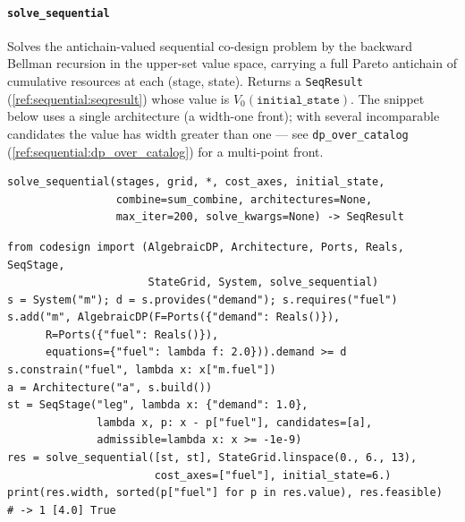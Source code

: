 \documentclass[11pt,a4paper]{article}
\begin{document}
\paragraph{\texttt{solve\_sequential}}\label{ref:sequential:solve_sequential}
Solves the antichain-valued sequential co-design problem by the backward
Bellman recursion in the upper-set value space, carrying a full Pareto
antichain of cumulative resources at each (stage, state). Returns a
\texttt{SeqResult} (\ref{ref:sequential:seqresult}) whose value is
$V_0(\texttt{initial\_state})$. The snippet below uses a single architecture
(a width-one front); with several incomparable candidates the value has
width greater than one --- see \texttt{dp\_over\_catalog}
(\ref{ref:sequential:dp_over_catalog}) for a multi-point front.
\begin{lstlisting}
solve_sequential(stages, grid, *, cost_axes, initial_state,
                 combine=sum_combine, architectures=None,
                 max_iter=200, solve_kwargs=None) -> SeqResult
\end{lstlisting}
\begin{lstlisting}
from codesign import (AlgebraicDP, Architecture, Ports, Reals, SeqStage,
                      StateGrid, System, solve_sequential)
s = System("m"); d = s.provides("demand"); s.requires("fuel")
s.add("m", AlgebraicDP(F=Ports({"demand": Reals()}),
      R=Ports({"fuel": Reals()}),
      equations={"fuel": lambda f: 2.0})).demand >= d
s.constrain("fuel", lambda x: x["m.fuel"])
a = Architecture("a", s.build())
st = SeqStage("leg", lambda x: {"demand": 1.0},
              lambda x, p: x - p["fuel"], candidates=[a],
              admissible=lambda x: x >= -1e-9)
res = solve_sequential([st, st], StateGrid.linspace(0., 6., 13),
                       cost_axes=["fuel"], initial_state=6.)
print(res.width, sorted(p["fuel"] for p in res.value), res.feasible)
# -> 1 [4.0] True
\end{lstlisting}
\end{document}
